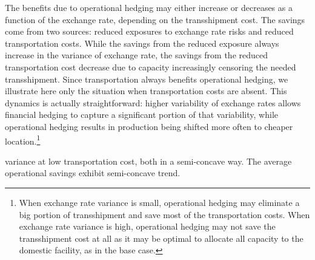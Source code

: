\documentclass[mnsc,nonblindrev,copyedit]{informs2_wz} %
\begin{document}
The benefits due to operational hedging may either increase or decreases as a function of the exchange rate, depending on the transshipment cost.  The savings come from two sources: reduced exposures to exchange rate risks and reduced transportation costs.  While the savings from the reduced exposure always increase in the variance of exchange rate, the savings from the reduced transportation cost decrease due to capacity increasingly censoring the needed transshipment.  Since transportation always benefits operational hedging, we illustrate here only the situation when transportation costs are absent.  This dynamics is actually straightforward: higher variability of exchange rates allows financial hedging to capture a significant portion of that variability, while operational hedging results in production being shifted more often to cheaper location.\footnote{When exchange rate variance is small, operational hedging may eliminate a big portion of transshipment and save most of the transportation costs.  When exchange rate variance is high, operational hedging may not save the transshipment cost at all as it may be optimal to allocate all capacity to the domestic facility, as in the base case.}


 variance at low transportation cost, both in a semi-concave way. The average operational savings exhibit semi-concave trend.
\end{document}
